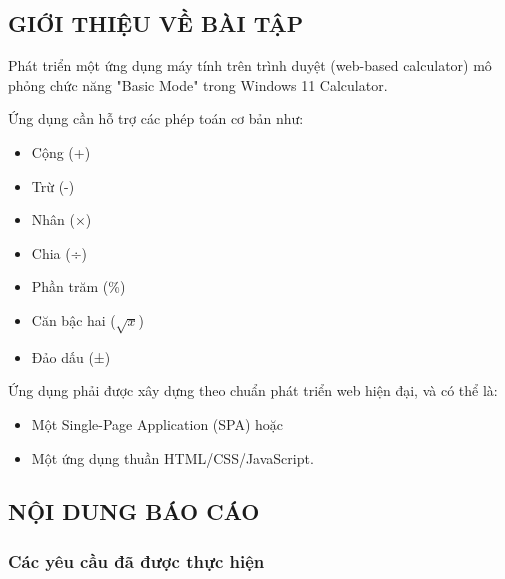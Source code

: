 
\lstset{style=mystyle}


\subsection{GIỚI THIỆU VỀ BÀI TẬP}

Phát triển một ứng dụng máy tính trên trình duyệt (web-based calculator) mô phỏng chức năng "Basic Mode" trong Windows 11 Calculator.

Ứng dụng cần hỗ trợ các phép toán cơ bản như:
\begin{itemize}
    \item Cộng (+)
    \item Trừ (-)
    \item Nhân (×)
    \item Chia (÷)
    \item Phần trăm (\%)
    \item Căn bậc hai ($\sqrt{x}$)
    \item Đảo dấu (±)
\end{itemize}

Ứng dụng phải được xây dựng theo chuẩn phát triển web hiện đại, và có thể là:
\begin{itemize}
    \item Một Single-Page Application (SPA) hoặc
    \item Một ứng dụng thuần HTML/CSS/JavaScript.
\end{itemize}

\subsection{NỘI DUNG BÁO CÁO}

\subsubsection{Các yêu cầu đã được thực hiện}

